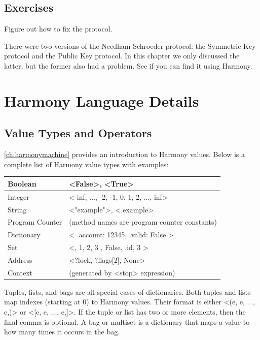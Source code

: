 \documentclass{report}
\begin{document}
\section*{Exercises}
\begin{problems}
\item Figure out how to fix the protocol.
\item There were two versions of the Needham-Schroeder protocol: the
Symmetric Key protocol and the Public Key protocol.  In this chapter
we only discussed the latter, but the former also had a problem.  See
if you can find it using Harmony.
\end{problems}




\appendix

\chapter{Harmony Language Details}

\section{Value Types and Operators}
\label{ap:values}

\autoref{ch:harmonymachine} provides an introduction to Harmony values.
Below is a complete list of Harmony value types with examples:

\vspace{1em}
\begin{tabular}{|l|l|}
\hline
Boolean & <{False}>, <{True}> \\
\hline
Integer & <{-inf, ..., -2, -1, 0, 1, 2, ..., inf}> \\
\hline
String & <{"example"}>, <{.example}> \\
\hline
Program Counter & (method names are program counter constants) \\
\hline
Dictionary & <{{ .account: 12345, .valid: False }}> \\
\hline
Set & <{{}, { 1, 2, 3 }, { False, .id, 3 }}> \\
\hline
Address & <{?lock, ?flags[2], None}> \\
\hline
Context & (generated by <{stop}> expression) \\
\hline
\end{tabular}
\vspace{1em}

Tuples, lists, and bags are all special cases of dictionaries.
Both tuples and lists map indexes (starting at 0) to Harmony values.
Their format is either <{(e, e, ..., e,)}> or <{[e, e, ..., e,]}>.
If the tuple or list has two or more elements, then the final comma
is optional.
A bag or multiset is a dictionary that maps a value to how many
times it occurs in the bag.
\end{document}
